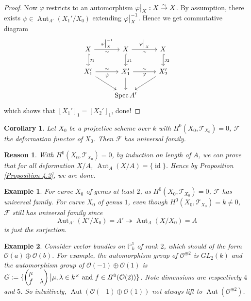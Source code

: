\documentclass{ctexart}
\newtheorem{reason}{Reason}[section]
\newtheorem{example}{Example}[section]
\newtheorem{corollary}{Corollary}[section]
\newcommand{\identity}{\operatorname{id}}
\newcommand{\aut}{\operatorname{Aut}}
\newcommand{\spec}{\operatorname{Spec}}
\begin{document}
\begin{proof}
    Now $\varphi$ restricts to an automorphism $\varphi\big{|}_{X}: X \overset{\sim}{\rightarrow} X$.
    By assumption, there exists $\psi\in \aut_{A'}(X_{1}'/X_{0})$ extending $\varphi\big{|}_{X}^{-1}$.
    Hence we get commutative diagram
    \begin{equation}
        \begin{tikzcd}
            X \arrow[r, "\varphi\big{|}_{X}^{-1}", "\sim" swap] \arrow[d, hookrightarrow, "j_{1}"] &
            X \arrow[r, "\varphi\big{|}_{X}", "\sim" swap] \arrow[d, hookrightarrow, "j_{1}"] &
            X \arrow[d, hookrightarrow, "j_{2}"] \\
            X_{1}' \arrow[r, "\sim", "\psi" swap] \arrow[dr] &
            X_{1}' \arrow[r, "\sim", "\varphi" swap] \arrow[d] &
            X_{2}' \arrow[dl] \\
            & \spec A' &
        \end{tikzcd}
    \end{equation}
    which shows that $[X_{1}']_{1} = [X_{2}']_{1}$, done!
\end{proof}
\begin{corollary}
    Let $X_{0}$ be a projective scheme over $k$ with $H^{0}(X_{0}, \mathcal{T}_{X_{0}}) = 0$, $\mathcal{F}$ the deformation functor of $X_{0}$.
    Then $\mathcal{F}$ has universal family.
    \label{Corollary 4.1}
\end{corollary}
\begin{reason}
    With $H^{0}(X_{0}, \mathcal{T}_{X_{0}}) = 0$, by induction on length of $A$,
    we can prove that for all deformation $X/A$, $\aut_{A}(X/A) = \{\identity\}$.
    Hence by Proposition \ref{Proposition 4.2}, we are done.
\end{reason}
\begin{example}
    For curve $X_{0}$ of genus at least $2$, as $H^{0}(X_{0}, \mathcal{T}_{X_{0}}) = 0$, $\mathcal{F}$ has universal family.
    For curve $X_{0}$ of genus $1$, even though $H^{0}(X_{0}, \mathcal{T}_{X_{0}}) = k \neq 0$, $\mathcal{F}$ still has universal family since
    \begin{equation}
        \aut_{A'}(X'/X_{0}) = A' \twoheadrightarrow \aut_{A}(X/X_{0}) = A
    \end{equation}
    is just the surjection.
\end{example}
\begin{example}
    Consider vector bundles on $\mathbb{P}_{k}^{1}$ of rank $2$, which should of the form $\mathcal{O}(a) \oplus \mathcal{O}(b)$.
    For example, the automorphism group of $\mathcal{O}^{\oplus 2}$ is $GL_{2}(k)$ and the automorphism group of $\mathcal{O}(-1) \oplus \mathcal{O}(1)$ is $G := \{
    \begin{pmatrix}
        \mu & \\
        f & \lambda
    \end{pmatrix}
    \big{|}
    \mu,\lambda\in k^{\times} \text{ and } f\in H^{0}(\mathcal{O}(2))
    \}$.
    Note dimensions are respectively $4$ and $5$.
    So intuitively, $\aut(\mathcal{O}(-1) \oplus \mathcal{O}(1))$ not always lift to $\aut(\mathcal{O}^{\oplus 2})$.
\end{example}
\end{document}
